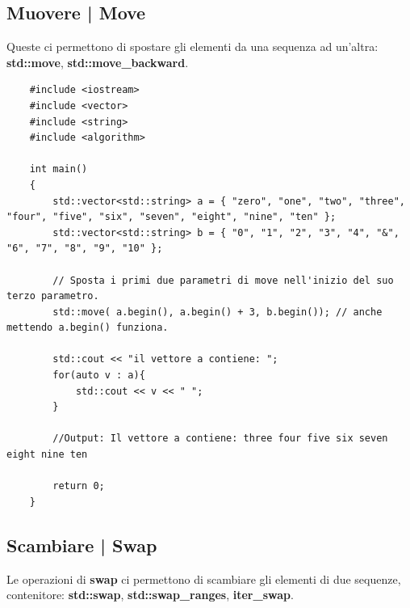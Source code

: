 \subsection{Muovere | Move}

\textsf{\small Queste ci permettono di spostare gli elementi da una sequenza ad un'altra: \textbf{std::move}, \textbf{std::move\_backward}.} \\

\begin{lstlisting}
	#include <iostream>
	#include <vector>
	#include <string>
	#include <algorithm>
	
	int main()
	{
		std::vector<std::string> a = { "zero", "one", "two", "three", "four", "five", "six", "seven", "eight", "nine", "ten" };
		std::vector<std::string> b = { "0", "1", "2", "3", "4", "&", "6", "7", "8", "9", "10" };
		
		// Sposta i primi due parametri di move nell'inizio del suo terzo parametro.
		std::move( a.begin(), a.begin() + 3, b.begin()); // anche mettendo a.begin() funziona.
		
		std::cout << "il vettore a contiene: ";
		for(auto v : a){
			std::cout << v << " ";
		}
	
		//Output: Il vettore a contiene: three four five six seven eight nine ten
		
		return 0;
	}
\end{lstlisting}

\subsection{Scambiare | Swap}

\textsf{\small Le operazioni di \textbf{swap} ci permettono di scambiare gli elementi di due sequenze, contenitore: \textbf{std::swap}, \textbf{std::swap\_ranges}, \textbf{iter\_swap}.} \\

